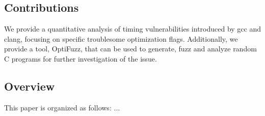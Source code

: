 \subsection{Contributions}
We provide a quantitative analysis of timing vulnerabilities introduced by gcc and clang, focusing on specific troublesome optimization flags.
Additionally, we provide a tool, OptiFuzz, that can be used to generate, fuzz and analyze random C programs for further investigation of the issue.
\subsection{Overview}
This paper is organized as follows: $\ldots$ 
